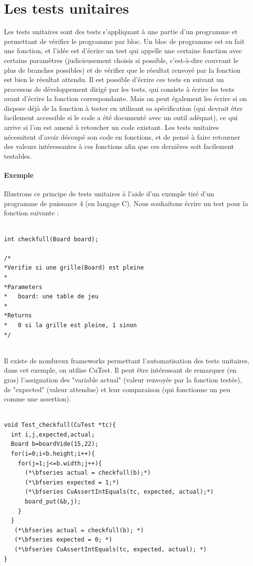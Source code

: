 \documentclass{report}
\begin{document}
\section{Les tests unitaires}
Les tests unitaires sont des tests s'appliquant à une partie d'un programme et permettant de vérifier le programme par bloc. Un bloc de programme est en fait une fonction, et l'idée est d'écrire un test qui appelle une certaine fonction avec certains paramètres (judicieusement choisis si possible, c'est-à-dire couvrant le plus de branches possibles) et de vérifier que le résultat renvoyé par la fonction est bien le résultat attendu. Il est possible d'écrire ces tests en suivant un processus de développement dirigé par les tests, qui consiste à écrire les tests avant d'écrire la fonction correspondante. Mais on peut également les écrire si on dispose déjà de la fonction à tester en utilisant sa spécification (qui devrait être facilement accessible si le code a été documenté avec un outil adéquat), ce qui arrive si l'on est amené à retoucher un code existant. Les tests unitaires nécessitent d'avoir découpé son code en fonctions, et de pensé à faire retourner des valeurs intéressantes à ces fonctions afin que ces dernières soit facilement testables.

\paragraph{Exemple}
Illustrons ce principe de tests unitaires à l'aide d'un exemple tiré d'un programme de puissance 4 (en langage C). Nous souhaitons écrire un test pour la fonction suivante :

\begin{scriptsize}
\begin{lstlisting}

int checkfull(Board board);

/*
*Verifie si une grille(Board) est pleine
*
*Parameters
*   board: une table de jeu
*
*Returns
*   0 si la grille est pleine, 1 sinon
*/


\end{lstlisting}
\end{scriptsize}

Il existe de nombreux frameworks permettant l'automatisation des tests unitaires, dans cet exemple, on utilise CuTest. Il peut être intéressant de remarquer (en gras) l'assignation des "variable actual" (valeur renvoyée par la fonction testée), de "expected" (valeur attendue) et leur comparaison (qui fonctionne un peu comme une assertion).
\begin{scriptsize}
\begin{lstlisting}

void Test_checkfull(CuTest *tc){
  int i,j,expected,actual;
  Board b=boardVide(15,22);
  for(i=0;i<b.height;i++){
    for(j=1;j<=b.width;j++){
      (*\bfseries actual = checkfull(b);*)
      (*\bfseries expected = 1;*)
      (*\bfseries CuAssertIntEquals(tc, expected, actual);*)
      board_put(&b,j);
    }
  }
   (*\bfseries actual = checkfull(b); *)
   (*\bfseries expected = 0; *)
   (*\bfseries CuAssertIntEquals(tc, expected, actual); *)
}

\end{lstlisting}
\end{scriptsize}
\end{document}
